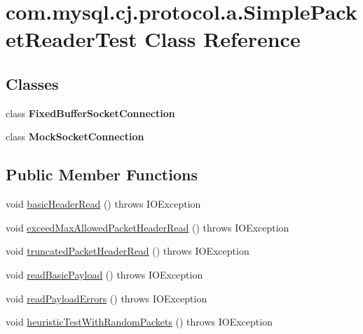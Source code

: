 \hypertarget{classcom_1_1mysql_1_1cj_1_1protocol_1_1a_1_1_simple_packet_reader_test}{}\section{com.\+mysql.\+cj.\+protocol.\+a.\+Simple\+Packet\+Reader\+Test Class Reference}
\label{classcom_1_1mysql_1_1cj_1_1protocol_1_1a_1_1_simple_packet_reader_test}
\subsection*{Classes}
\begin{DoxyCompactItemize}
\item 
class {\bfseries Fixed\+Buffer\+Socket\+Connection}
\item 
class {\bfseries Mock\+Socket\+Connection}
\end{DoxyCompactItemize}
\subsection*{Public Member Functions}
\begin{DoxyCompactItemize}
\item 
void \mbox{\hyperlink{classcom_1_1mysql_1_1cj_1_1protocol_1_1a_1_1_simple_packet_reader_test_a1f7b37b061f0ada311d62bb5fd26bad4}{basic\+Header\+Read}} ()  throws I\+O\+Exception 
\item 
void \mbox{\hyperlink{classcom_1_1mysql_1_1cj_1_1protocol_1_1a_1_1_simple_packet_reader_test_ab864f41b5c602198467dac2ee07dce27}{exceed\+Max\+Allowed\+Packet\+Header\+Read}} ()  throws I\+O\+Exception 
\item 
void \mbox{\hyperlink{classcom_1_1mysql_1_1cj_1_1protocol_1_1a_1_1_simple_packet_reader_test_aeab8953b67cd52f0c1c001e4b59fd584}{truncated\+Packet\+Header\+Read}} ()  throws I\+O\+Exception 
\item 
void \mbox{\hyperlink{classcom_1_1mysql_1_1cj_1_1protocol_1_1a_1_1_simple_packet_reader_test_a3b2e9100262ef54c4a6a58aed877442a}{read\+Basic\+Payload}} ()  throws I\+O\+Exception 
\item 
void \mbox{\hyperlink{classcom_1_1mysql_1_1cj_1_1protocol_1_1a_1_1_simple_packet_reader_test_a71ae7e26122458c2fd135aacdfcdbf06}{read\+Payload\+Errors}} ()  throws I\+O\+Exception 
\item 
void \mbox{\hyperlink{classcom_1_1mysql_1_1cj_1_1protocol_1_1a_1_1_simple_packet_reader_test_a167ef7e01235c823278cb01e05af9920}{heuristic\+Test\+With\+Random\+Packets}} ()  throws I\+O\+Exception 
\end{DoxyCompactItemize}


